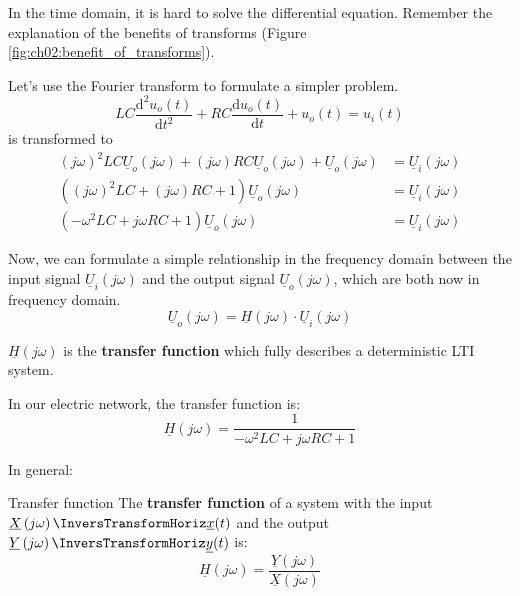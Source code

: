 \begin{refsection}
In the time domain, it is hard to solve the differential equation. Remember the explanation of the benefits of transforms (Figure \ref{fig:ch02:benefit_of_transforms}).

Let's use the Fourier transform to formulate a simpler problem.
\begin{equation*}
	L C \frac{\mathrm{d}^2 u_o(t)}{\mathrm{d} t^2} + R C \frac{\mathrm{d} u_o(t)}{\mathrm{d} t} + u_o(t) = u_i(t)
\end{equation*}
is transformed to
\begin{equation}
	\begin{split}
		\left(j \omega\right)^2 L C \underline{U}_o\left(j \omega\right) + \left(j \omega\right) R C \underline{U}_o\left(j \omega\right) + \underline{U}_o\left(j \omega\right) &= \underline{U}_i\left(j \omega\right) \\
		\left(\left(j \omega\right)^2 L C + \left(j \omega\right) R C + 1\right) \underline{U}_o\left(j \omega\right) &= \underline{U}_i\left(j \omega\right) \\
		\left(- \omega^2 L C + j \omega R C + 1\right) \underline{U}_o\left(j \omega\right) &= \underline{U}_i\left(j \omega\right)
	\end{split}
\end{equation}

Now, we can formulate a simple relationship in the frequency domain between the input signal $\underline{U}_i\left(j \omega\right)$ and the output signal $\underline{U}_o\left(j \omega\right)$, which are both now in frequency domain.
\begin{equation}
	\underline{U}_o\left(j \omega\right) = \underline{H} \left(j \omega\right) \cdot \underline{U}_i\left(j \omega\right)
\end{equation}

$\underline{H} \left(j \omega\right)$ is the  \textbf{transfer function} which fully describes a deterministic \ac{LTI} system.

In our electric network, the transfer function is:
\begin{equation}
	\underline{H} \left(j \omega\right) = \frac{1}{- \omega^2 L C + j \omega R C + 1}
\end{equation}

In general:
\begin{definition}{Transfer function}
	The  \textbf{transfer function} of a system with the input $\underline{X}\left(j \omega\right) \InversTransformHoriz \underline{x}(t)$ and the output $\underline{Y}\left(j \omega\right) \InversTransformHoriz \underline{y}(t)$ is:
	\begin{equation}
		\underline{H} \left(j \omega\right) = \frac{\underline{Y}\left(j \omega\right)}{\underline{X}\left(j \omega\right)}
		\label{eq:ch02:tranfer_func}
	\end{equation}
\end{definition}


\end{refsection}
